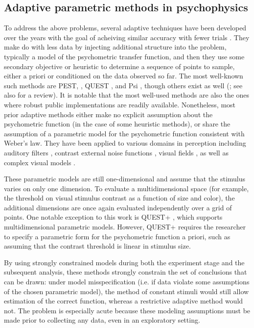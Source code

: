\documentclass[../main.tex]{subfiles}
\begin{document}
\subsection{Adaptive parametric methods in psychophysics}

To address the above problems, several adaptive techniques have been developed over the years with the goal of
acheiving similar accuracy with fewer trials \citep{Leek2001}. They make do with less data by injecting
additional structure into the problem, typically a model of the psychometric transfer function, and then they
use some secondary objective or heuristic to determine a sequence of points to sample, either a priori or
conditioned on the data observed so far. The most well-known such methods are PEST, \citep{Taylor1967}, QUEST
\citep{Watson1983}, and Psi \citep{Kontsevich1999}, though others exist as well (\cite{Levitt1971,Watson1983};
see also \cite{Treutwein1995} for a review). It is notable that the most well-used methods are also the ones where robust public implementations are readily available. Nonetheless, most prior adaptive methods either make no explicit assumption about the psychometric
function (in the case of some heuristic methods), or share the assumption of a parametric model for the
psychometric function consistent with Weber's law. They have been applied to various domains in perception including auditory filters \citep{Shen2012}, contrast external noise functions \citep{Lesmes2006}, visual fields \citep{bengtsson1997new}, as well as complex visual models \citep{DiMattina2015}.

These parametric models are still one-dimensional and assume that the stimulus varies on only one dimension.
To evaluate a multidimensional space (for example, the threshold on visual stimulus contrast as a function of
size and color), the additional dimensions are once again evaluated independently over a grid of points. One notable exception to this work is QUEST+ \citep{Watson2017}, which supports multidimensional parametric models.
However, QUEST+ requires the researcher to specify a parametric form for the psychometric function a
priori, such as assuming that the contrast threshold is linear in stimulus size.

By using strongly constrained models during both the experiment stage and the subsequent analysis, these methods strongly constrain the set of conclusions that can be drawn: under model misspecification (i.e. if data violate
some assumptions of the chosen parametric model), the method of constant stimuli would still allow estimation of the correct
function, whereas a restrictive adaptive method would not. The problem is especially acute because these modeling assumptions must be made prior to collecting any data, even in an exploratory setting.
\end{document}

